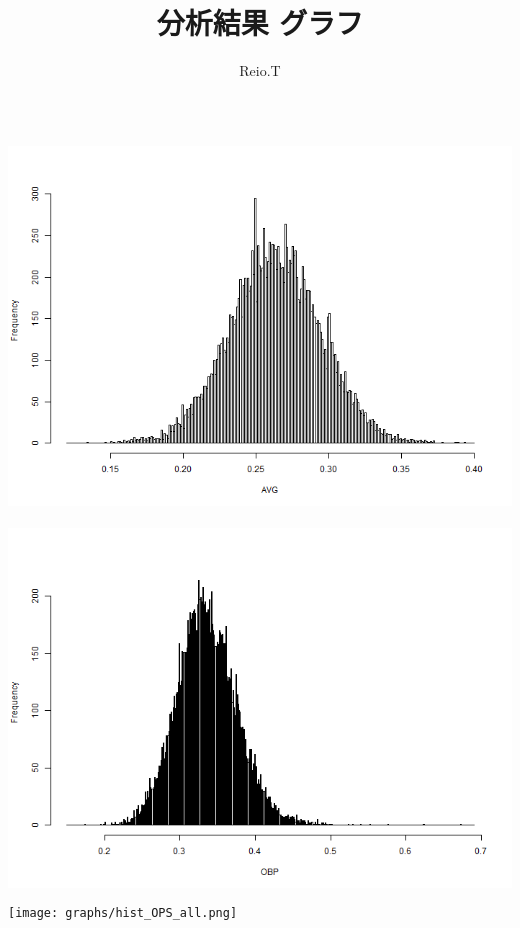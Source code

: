 \documentclass[dvipdfmx]{jsarticle}
\begin{document}
\title{分析結果 グラフ}
\author{Reio.T}
\date{}
\maketitle

\begin{center}

  
  

\newpage

  \includegraphics[width=14cm, height = 10cm]{graphs/hist_AVG_all.png}
  \includegraphics[width=14cm, height = 10cm]{graphs/hist_OBP_all.png}
  \texttt{[image: graphs/hist\_OPS\_all.png]}

\end{center}
\end{document}
